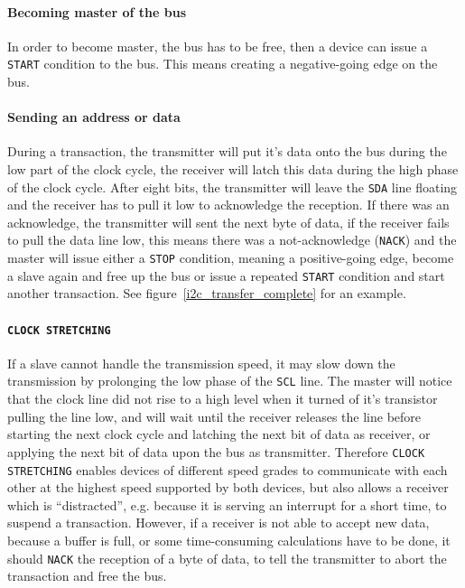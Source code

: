\documentclass[journal]{IEEEtran}
\newcommand{\sda}{\texttt{SDA}\xspace}
\newcommand{\scl}{\texttt{SCL}\xspace}
\newcommand{\startcondition}{\texttt{START} condition\xspace}
\newcommand{\stopcondition}{\texttt{STOP} condition\xspace}
\newcommand{\clockstretching}{\texttt{CLOCK STRETCHING}\xspace}
\newcommand{\nak}{\texttt{NACK}\xspace}
\begin{document}
\paragraph*{Becoming master of the bus}
In order to become master, the bus has to be free, then a device can issue a \startcondition to the bus. This means creating a negative-going edge on the bus.

\paragraph*{Sending an address or data}
During a transaction, the transmitter will put it's data onto the bus during the low part of the clock cycle, the receiver will latch this data during the high phase of the clock cycle. After eight bits, the transmitter will leave the \sda line floating and the receiver has to pull it low to acknowledge the reception. If there was an acknowledge, the transmitter will sent the next byte of data, if the receiver fails to pull the data line low, this means there was a not-acknowledge (\nak) and the master will issue either a \stopcondition, meaning a positive-going edge, become a slave again and free up the bus or issue a repeated \startcondition and start another transaction.
See figure~\ref{i2c_transfer_complete} for an example.

\paragraph*{\clockstretching}
If a slave cannot handle the transmission speed, it may slow down the transmission by prolonging the low phase of the \scl line.
The master will notice that the clock line did not rise to a high level when it turned of it's transistor pulling the line low, and will wait until the receiver releases the line before starting the next clock cycle and latching the next bit of data as receiver, or applying the next bit of data upon the bus as transmitter. Therefore \clockstretching enables devices of different speed grades to communicate with each other at the highest speed supported by both devices, but also allows a receiver which is ``distracted'', e.g. because it is serving an interrupt for a short time, to suspend a transaction. However, if a receiver is not able to accept new data, because a buffer is full, or some time-consuming calculations have to be done, it should \nak the reception of a byte of data, to tell the transmitter to abort the transaction and free the bus.
\end{document}
